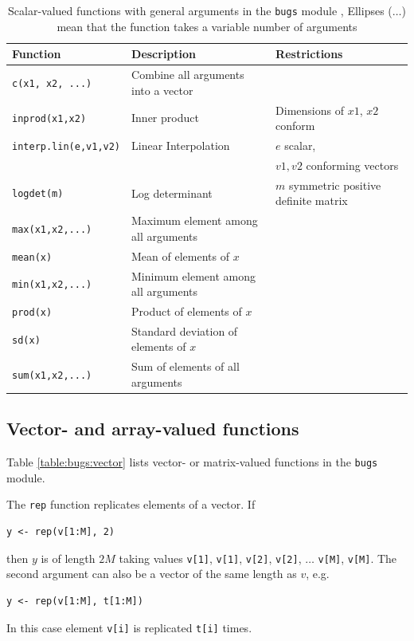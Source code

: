 \documentclass[11pt, a4paper, titlepage]{report}
\begin{document}
\begin{table}
\begin{tabular}{lll}
\hline
Function & Description & Restrictions \\
\hline
\verb+c(x1, x2, ...)+ & Combine all arguments into a vector \\
\verb+inprod(x1,x2)+ & Inner product & Dimensions of $x1$, $x2$ conform \\
\verb+interp.lin(e,v1,v2)+ & Linear Interpolation & $e$ scalar, \\
                          &                     & $v1,v2$ conforming vectors \\
\verb+logdet(m)+ & Log determinant & $m$ symmetric positive definite matrix \\
\verb+max(x1,x2,...)+ & Maximum element among all arguments & \\
\verb+mean(x)+  & Mean of elements of $x$ & \\
\verb+min(x1,x2,...)+ & Minimum element among all arguments & \\
\verb+prod(x)+  & Product of elements of $x$ & \\
\verb+sd(x)+    & Standard deviation of elements of $x$ & \\
\verb+sum(x1,x2,...)+   & Sum of elements of all arguments & \\
\hline
\end{tabular}
\caption{Scalar-valued functions with general
  arguments in the \texttt{bugs} module \label{table:bugs:scalar2},
  Ellipses ($\ldots$) mean that the function takes a variable number of
  arguments}
\end{table}

\subsection{Vector- and array-valued functions}

Table \ref{table:bugs:vector} lists vector- or matrix-valued functions
in the \texttt{bugs} module. 

The \texttt{rep} function replicates elements of a vector. If
\begin{verbatim}
y <- rep(v[1:M], 2)
\end{verbatim}
then $y$ is of length $2M$ taking values \verb+v[1]+, \verb+v[1]+,
\verb+v[2]+, \verb+v[2]+, $\ldots$ \verb+v[M]+, \verb+v[M]+.
The second argument can also be a vector of the same length as $v$,
e.g.
\begin{verbatim}
y <- rep(v[1:M], t[1:M])
\end{verbatim}
In this case element \verb+v[i]+ is replicated \verb+t[i]+ times.
\end{document}
